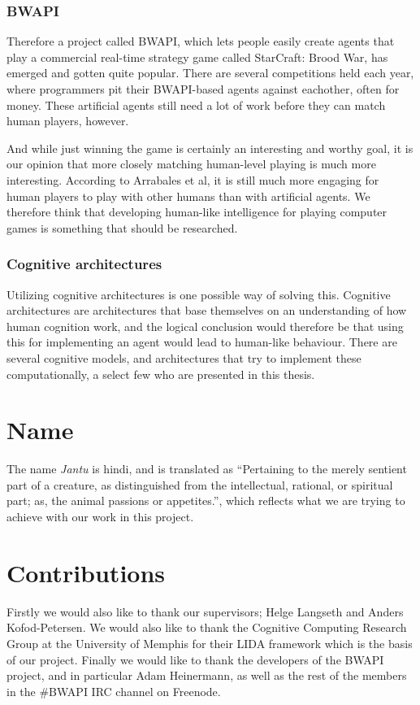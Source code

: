 \subsubsection{BWAPI}
Therefore a project called BWAPI, which lets people easily create agents that play a commercial real-time strategy game called StarCraft: Brood War, has emerged and gotten quite popular.\cite{bwapi} There are several competitions held each year, where programmers pit their BWAPI-based agents against eachother, often for money.\cite{sscait} These artificial agents still need a lot of work before they can match human players, however.\cite{eisbotvsfong}

And while just winning the game is certainly an interesting and worthy goal, it is our opinion that more closely matching human-level playing is much more interesting. According to Arrabales et al, it is still much more engaging for human players to play with other humans than with artificial agents.\cite{arrabales2009gamechars} We therefore think that developing human-like intelligence for playing computer games is something that should be researched.

\subsubsection{Cognitive architectures}
Utilizing cognitive architectures is one possible way of solving this. Cognitive architectures are architectures that base themselves on an understanding of how human cognition work, and the logical conclusion would therefore be that using this for implementing an agent would lead to human-like behaviour. There are several cognitive models, and architectures that try to implement these computationally, a select few who are presented in this thesis.

\section{Name}
\label{sec:name}
The name {\em Jantu} is hindi, and is translated as ``Pertaining to the merely sentient part of a creature, as distinguished from the intellectual, rational, or spiritual part; as, the animal passions or appetites.''\cite{hindijantu}, which reflects what we are trying to achieve with our work in this project.

\section{Contributions}
\label{sec:contributions}
Firstly we would also like to thank our supervisors; Helge Langseth and Anders Kofod-Petersen. We would also like to thank the Cognitive Computing Research Group at the University of Memphis for their LIDA framework which is the basis of our project. Finally we would like to thank the developers of the BWAPI project, and in particular Adam Heinermann, as well as the rest of the members in the \#BWAPI IRC channel on Freenode.

